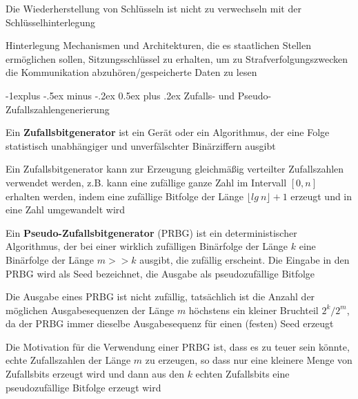 \documentclass[a4paper]{article}
\makeatletter
\renewcommand{\subsection}{\@startsection{subsection}{2}{0mm}%
 {-1explus -.5ex minus -.2ex}%
 {0.5ex plus .2ex}%
 {\normalfont\normalsize\bfseries}}
\makeatother
\begin{document}
\begin{multicols}{3}
\begin{description*}
\begin{itemize*}
                  \item Die Wiederherstellung von Schlüsseln ist nicht zu verwechseln mit der Schlüsselhinterlegung
            \end{itemize*}
            \item[Hinterlegung] Mechanismen und Architekturen, die es staatlichen Stellen ermöglichen sollen, Sitzungsschlüssel zu erhalten, um zu Strafverfolgungszwecken die Kommunikation abzuhören/gespeicherte Daten zu lesen
      \end{description*}

      \subsection{Zufalls- und Pseudo-Zufallszahlengenerierung}
      \begin{itemize*}
            \item Ein \textbf{Zufallsbitgenerator} ist ein Gerät oder ein Algorithmus, der eine Folge statistisch unabhängiger und unverfälschter Binärziffern ausgibt
            \item Ein Zufallsbitgenerator kann zur Erzeugung gleichmäßig verteilter Zufallszahlen verwendet werden, z.B. kann eine zufällige ganze Zahl im Intervall $[0,n]$ erhalten werden, indem eine zufällige Bitfolge der Länge $\lfloor lg\ n\rfloor+1$ erzeugt und in eine Zahl umgewandelt wird %
            \item Ein \textbf{Pseudo-Zufallsbitgenerator} (PRBG) ist ein deterministischer Algorithmus, der bei einer wirklich zufälligen Binärfolge der Länge $k$ eine Binärfolge der Länge $m>>k$ ausgibt, die zufällig erscheint. Die Eingabe in den PRBG wird als Seed bezeichnet, die Ausgabe als pseudozufällige Bitfolge
            \item Die Ausgabe eines PRBG ist nicht zufällig, tatsächlich ist die Anzahl der möglichen Ausgabesequenzen der Länge $m$ höchstens ein kleiner Bruchteil $2^k/2^m$, da der PRBG immer dieselbe Ausgabesequenz für einen (festen) Seed erzeugt
            \item Die Motivation für die Verwendung einer PRBG ist, dass es zu teuer sein könnte, echte Zufallszahlen der Länge $m$ zu erzeugen, so dass nur eine kleinere Menge von Zufallsbits erzeugt wird und dann aus den $k$ echten Zufallsbits eine pseudozufällige Bitfolge erzeugt wird

\end{itemize*}
\end{multicols}
\end{document}
